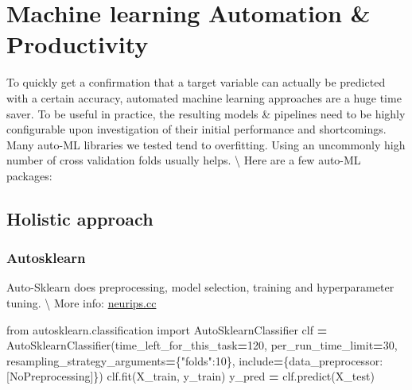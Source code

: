 \documentclass[
]{book}
\newenvironment{Shaded}{\begin{snugshade}}{\end{snugshade}}
\newcommand{\DecValTok}[1]{\textcolor[rgb]{0.00,0.00,0.81}{#1}}
\newcommand{\ImportTok}[1]{#1}
\newcommand{\NormalTok}[1]{#1}
\newcommand{\OperatorTok}[1]{\textcolor[rgb]{0.81,0.36,0.00}{\textbf{#1}}}
\newcommand{\StringTok}[1]{\textcolor[rgb]{0.31,0.60,0.02}{#1}}
\begin{document}
\hypertarget{machine-learning-automation-productivity}{%
\chapter{Machine learning Automation \& Productivity}\label{machine-learning-automation-productivity}}

To quickly get a confirmation that a target variable can actually be predicted with a certain accuracy, automated machine learning approaches are a huge time saver.
To be useful in practice, the resulting models \& pipelines need to be highly configurable upon investigation of their initial performance and shortcomings. Many auto-ML libraries we tested tend to overfitting. Using an uncommonly high number of cross validation folds usually helps.
\textbackslash{} Here are a few auto-ML packages:

\hypertarget{holistic-approach}{%
\section{Holistic approach}\label{holistic-approach}}

\hypertarget{autosklearn}{%
\subsection{Autosklearn}\label{autosklearn}}

Auto-Sklearn does preprocessing, model selection, training and hyperparameter tuning. \textbackslash{}
More info: \href{https://proceedings.neurips.cc/paper/2015/file/11d0e6287202fced83f79975ec59a3a6-Paper.pdf}{neurips.cc}

\begin{Shaded}
\begin{Highlighting}[]
\ImportTok{from}\NormalTok{ autosklearn.classification }\ImportTok{import}\NormalTok{ AutoSklearnClassifier}
\NormalTok{clf }\OperatorTok{=}\NormalTok{ AutoSklearnClassifier(time\_left\_for\_this\_task}\OperatorTok{=}\DecValTok{120}\NormalTok{, per\_run\_time\_limit}\OperatorTok{=}\DecValTok{30}\NormalTok{, resampling\_strategy\_arguments}\OperatorTok{=}\NormalTok{\{}\StringTok{"folds"}\NormalTok{:}\DecValTok{10}\NormalTok{\}, include}\OperatorTok{=}\NormalTok{\{}\StringTok{\textquotesingle{}data\_preprocessor\textquotesingle{}}\NormalTok{: [}\StringTok{\textquotesingle{}NoPreprocessing\textquotesingle{}}\NormalTok{]\})}
\NormalTok{clf.fit(X\_train, y\_train)}
\NormalTok{y\_pred }\OperatorTok{=}\NormalTok{ clf.predict(X\_test)}
\end{Highlighting}
\end{Shaded}
\end{document}
